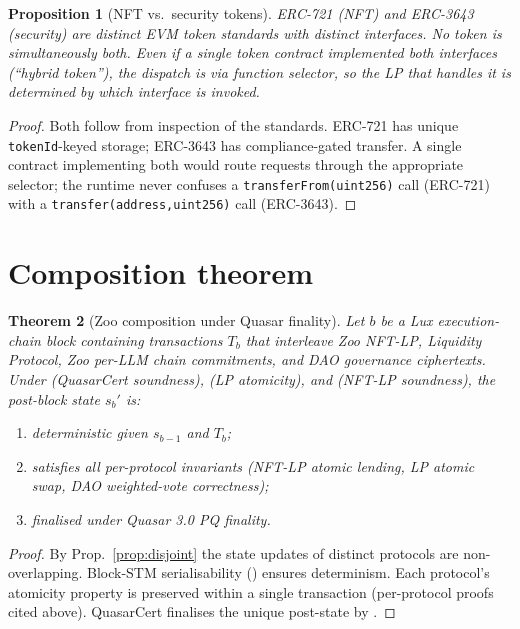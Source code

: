 \documentclass[11pt]{article}
\newtheorem{theorem}{Theorem}
\newtheorem{proposition}[theorem]{Proposition}
\begin{document}
\begin{proposition}[NFT vs.\ security tokens]
\label{prop:nft-vs-sec}
ERC-721 (NFT) and ERC-3643 (security) are distinct EVM token
standards with distinct interfaces. No token is simultaneously
both. Even if a single token contract implemented both interfaces
(``hybrid token''), the dispatch is via function selector, so the
LP that handles it is determined by which interface is invoked.
\end{proposition}

\begin{proof}
Both follow from inspection of the standards. ERC-721 has unique
\texttt{tokenId}-keyed storage; ERC-3643 has compliance-gated
transfer. A single contract implementing both would route requests
through the appropriate selector; the runtime never confuses a
\texttt{transferFrom(uint256)} call (ERC-721) with a
\texttt{transfer(address,uint256)} call (ERC-3643).
\end{proof}

\section{Composition theorem}
\label{sec:compose}

\begin{theorem}[Zoo composition under Quasar finality]
\label{thm:compose}
Let $b$ be a Lux execution-chain block containing transactions
$T_b$ that interleave Zoo NFT-LP, Liquidity Protocol, Zoo per-LLM
chain commitments, and DAO governance ciphertexts. Under
\cite[Theorem 7.5]{quasar-cert} (QuasarCert soundness),
\cite[Theorem 5.2]{liquidity-lp} (LP atomicity), and
\cite[Theorem 4.1]{zoo-nft-lp} (NFT-LP soundness), the post-block
state $s_b'$ is:
\begin{enumerate}[nosep]
  \item deterministic given $s_{b-1}$ and $T_b$;
  \item satisfies all per-protocol invariants
        (NFT-LP atomic lending, LP atomic swap, DAO weighted-vote
        correctness);
  \item finalised under Quasar 3.0 PQ finality.
\end{enumerate}
\end{theorem}

\begin{proof}
By Prop.~\ref{prop:disjoint} the state updates of distinct
protocols are non-overlapping. Block-STM serialisability
(\cite{dagevm-lean}) ensures determinism. Each protocol's atomicity
property is preserved within a single transaction (per-protocol
proofs cited above). QuasarCert finalises the unique post-state by
\cite[Theorem 7.5]{quasar-cert}.
\end{proof}
\end{document}
